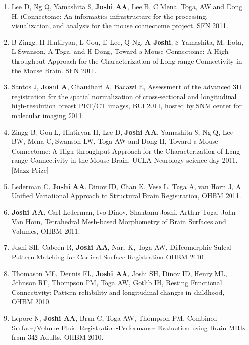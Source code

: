 \documentclass[overlapped,line,letterpaper]{res}
\begin{document}
\begin{resume}
\begin{enumerate}
    \item Lee D, Ng Q, Yamashita S, \textbf{Joshi AA}, Lee B, C Mena, Toga, AW and Dong H, {iConnectome: An informatics infrastructure for the processing, visualization, and analysis for the mouse connectome project}. SFN 2011.

    \item B Zingg, H Hintiryan, L Gou, D Lee, Q Ng, \textbf{A Joshi}, S Yamashita, M. Bota, L Swanson, A Toga, and H Dong, {Toward a Mouse Connectome: A High-throughput Approach for the Characterization of Long-range Connectivity in the Mouse Brain}. SFN 2011.

    \item Santos J, \textbf{Joshi A}, Chaudhari A, Badawi R, {Assessment of the advanced 3D registration for the spatial normalization of cross-sectional and longitudinal high-resolution breast PET/CT images}, BCI 2011, hosted by SNM center for molecular imaging  2011.

    \item Zingg B, Gou L, Hintiryan H, Lee D, \textbf{Joshi AA}, Yamashita S, Ng Q, Lee BW, Mena C, Swanson LW, Toga AW and Dong H, {Toward a Mouse Connectome: A High-throughput Approach for the Characterization of Long-range Connectivity in the Mouse Brain}. UCLA Neurology science day 2011. [Mazz Prize]

    \item Lederman C, \textbf{Joshi AA}, Dinov ID, Chan K, Vese L, Toga A, van Horn J, {A Unified Variational Approach to Structural Brain Registration}, OHBM 2011.

    \item \textbf{Joshi AA}, Carl Lederman, Ivo Dinov, Shantanu Joshi, Arthur Toga, John Van Horn, {Tetrahedral Mesh-based Morphometry of Brain Surfaces and Volumes}, OHBM 2011.


    \item Joshi SH, Cabeen R, \textbf{Joshi AA}, Narr K, Toga AW, Diffeomorphic Sulcal Pattern Matching for Cortical Surface Registration OHBM 2010.

    \item Thomason ME, Dennis EL, \textbf{Joshi AA}, Joshi SH, Dinov ID, Henry ML, Johnson RF, Thompson PM, Toga AW, Gotlib IH, Resting Functional Connectivity: Pattern reliability and longitudinal changes in childhood, OHBM 2010.

    \item Lepore N, \textbf{Joshi AA}, Brun C, Toga AW, Thompson PM, Combined Surface/Volume Fluid Registration-Performance Evaluation using Brain MRIs from 342 Adults, OHBM 2010.


\end{enumerate}
\end{resume}
\end{document}
